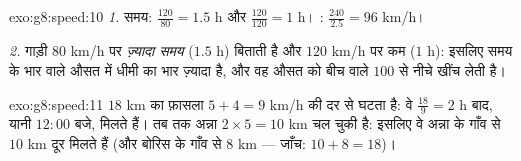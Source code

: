 \begin{solution}{exo:g8:speed:10}
\emph{1.} समय: $\frac{120}{80} = 1.5$ h और $\frac{120}{120} = 1$
h। : $\frac{240}{2.5} = 96$ km/h।

\emph{2.} गाड़ी $80$ km/h पर \emph{ज़्यादा समय} ($1.5$ h) बिताती है
और $120$ km/h पर कम ($1$ h): इसलिए समय के भार वाले औसत में धीमी 
का भार ज़्यादा है, और वह औसत को बीच वाले $100$ से नीचे खींच लेती है।
\end{solution}

\begin{solution}{exo:g8:speed:11}
$18$ km का फ़ासला $5 + 4 = 9$ km/h की दर से घटता है: वे
$\frac{18}{9} = 2$ h बाद, यानी $12{:}00$ बजे, मिलते हैं। तब तक
अन्ना $2 \times 5 = 10$ km चल चुकी है: इसलिए वे अन्ना के गाँव से
$10$ km दूर मिलते हैं (और बोरिस के गाँव से $8$ km --- जाँच:
$10 + 8 = 18$)।
\end{solution}


